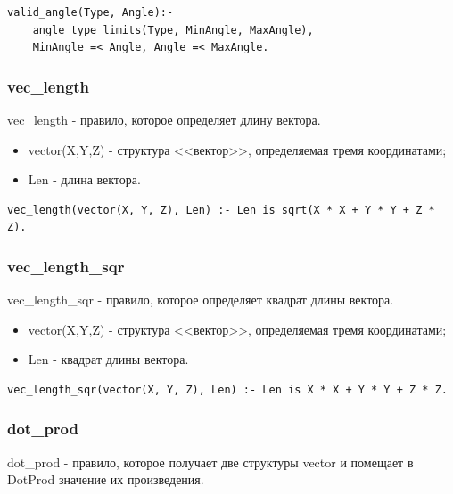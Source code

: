 \begin{lstlisting}[caption=Реализация правила valid\_angle, label=rules:validangle]
valid_angle(Type, Angle):-
	angle_type_limits(Type, MinAngle, MaxAngle),
	MinAngle =< Angle, Angle =< MaxAngle.
\end{lstlisting}


\subsubsection{vec\_length}
\hspace{0.6cm} vec\_length - правило, которое определяет длину вектора.

\begin{itemize}
	\item vector(X,Y,Z) - структура <<вектор>>, определяемая тремя координатами;
	\item Len - длина вектора.
\end{itemize}

\begin{lstlisting}[caption=Реализация правила vec\_length, label=rules:veclength]
vec_length(vector(X, Y, Z), Len) :- Len is sqrt(X * X + Y * Y + Z * Z).
\end{lstlisting}

\subsubsection{vec\_length\_sqr}

\hspace{0.6cm} vec\_length\_sqr - правило, которое определяет квадрат длины вектора.

\begin{itemize}
	\item vector(X,Y,Z) - структура <<вектор>>, определяемая тремя координатами;
	\item Len - квадрат длины вектора.
\end{itemize}

\begin{lstlisting}[caption=Реализация правила vec\_length\_sqr, label=rules:veclengthsqr]
vec_length_sqr(vector(X, Y, Z), Len) :- Len is X * X + Y * Y + Z * Z.
\end{lstlisting}

\subsubsection{dot\_prod}
\hspace{0.6cm} dot\_prod - правило, которое получает две структуры vector и помещает в DotProd значение их произведения.


